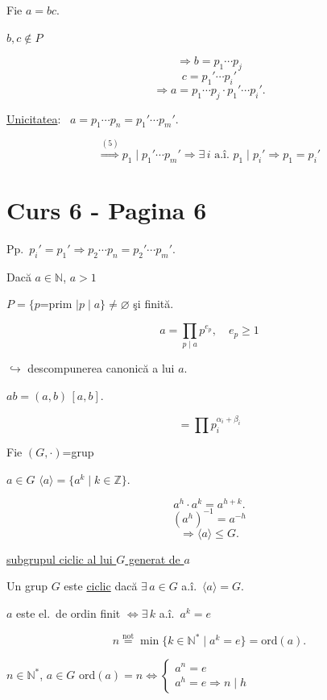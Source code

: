 \bigskip
\noindent Fie $a=bc$.

\noindent $b,c\notin P$

\[
\Rightarrow b=p_1\cdots p_j
\]
\[
c=p_1'\cdots p_i'
\]
\[
\Rightarrow a = p_1\cdots p_j\cdot p_1'\cdots p_i'.
\]

\bigskip
\noindent\underline{Unicitatea}: \ $a = p_1\cdots p_n = p_1'\cdots p_m'$.

\[
\overset{(5)}{\Longrightarrow} p_1\mid p_1'\cdots p_m' \Rightarrow \exists\, i \text{ a.î. } p_1\mid p_i' \Rightarrow p_1=p_i'
\]





\section*{Curs 6 - Pagina 6}

\noindent Pp.\ $p_i'=p_1' \Rightarrow p_2\cdots p_n = p_2'\cdots p_m'$.

\bigskip
\noindent Dacă $a\in\mathbb{N}$, $a>1$

\noindent $P=\{p$=prim $\mid p\mid a\} \neq \varnothing$ şi finită.

\[
a = \prod_{p\mid a} p^{e_p}, \quad e_p\geq 1
\]

\noindent $\hookrightarrow$ descompunerea canonică a lui $a$.

\bigskip
\noindent\underline{\phantom{xx}}

\noindent $ab = (a,b)\,[a,b]$.

\[
= \prod p_i^{\alpha_i+\beta_i}
\]

\bigskip
\noindent Fie $(G,\cdot)$=grup

\noindent $a\in G$ \quad $\langle a\rangle = \{a^k \mid k\in\mathbb{Z}\}$.

\[
a^h\cdot a^k = a^{h+k}.
\]
\[
(a^h)^{-1} = a^{-h}
\]
\[
\Rightarrow \langle a\rangle \leq G.
\]

\noindent\underline{subgrupul ciclic al lui $G$ generat de $a$}

\bigskip
\noindent Un grup $G$ este \underline{ciclic} dacă $\exists\,a\in G$ a.î.\ $\langle a\rangle = G$.

\bigskip
\noindent $a$ este el.\ de ordin finit $\Leftrightarrow \exists\,k$ a.î.\ $a^k=e$

\[
n \overset{\text{not}}{=} \min\{k\in\mathbb{N}^* \mid a^k=e\} = \text{ord}(a).
\]

\bigskip
\noindent $n\in\mathbb{N}^*$, $a\in G$ \qquad ord$(a)=n \Leftrightarrow \begin{cases}a^n=e\\ a^h=e \Rightarrow n\mid h\end{cases}$

